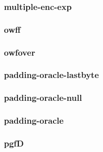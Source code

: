 \begin{frame} \frametitle{multiple-enc-exp}
\begin{figure}
\begin{center}

\end{center}
\end{figure}
\end{frame}
\begin{frame} \frametitle{owff}
\begin{figure}
\begin{center}

\end{center}
\end{figure}
\end{frame}
\begin{frame} \frametitle{owfover}
\begin{figure}
\begin{center}

\end{center}
\end{figure}
\end{frame}
\begin{frame} \frametitle{padding-oracle-lastbyte}
\begin{figure}
\begin{center}

\end{center}
\end{figure}
\end{frame}
\begin{frame} \frametitle{padding-oracle-null}
\begin{figure}
\begin{center}

\end{center}
\end{figure}
\end{frame}
\begin{frame} \frametitle{padding-oracle}
\begin{figure}
\begin{center}

\end{center}
\end{figure}
\end{frame}
\begin{frame} \frametitle{pgfD}
\begin{figure}
\begin{center}

\end{center}
\end{figure}
\end{frame}
